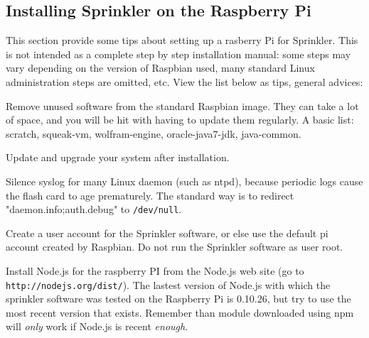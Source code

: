 \documentclass[11pt]{book}
\begin{document}
\subsection{Installing Sprinkler on the Raspberry Pi}
This section provide some tips about setting up a rasberry Pi for Sprinkler. This is not intended as a complete step by step installation manual: some steps may vary depending on the version of Raspbian used, many standard Linux administration steps are omitted, etc. View the list below as tips, general advices:
\begin{description}
\item Remove unused software from the standard Raspbian image. They can take a lot of space, and you will be hit with having to update them regularly. A basic list: scratch, squeak-vm, wolfram-engine, oracle-java7-jdk, java-common.
\item Update and upgrade your system after installation.
\item Silence syslog for many Linux daemon (such as ntpd), because periodic logs cause the flash card to age prematurely. The standard way is to redirect "daemon.info;auth.debug" to \texttt{/dev/null}.
\item Create a user account for the Sprinkler software, or else use the default pi account created by Raspbian. Do not run the Sprinkler software as user root.
\item Install Node.js for the raspberry PI from the Node.js web site (go to \texttt{http://nodejs.org/dist/}). The lastest version of Node.js with which the sprinkler software was tested on the Raspberry Pi is 0.10.26, but try to use the most recent version that exists. Remember than module downloaded using npm will \emph{only} work if Node.js is recent \emph{enough}.
\end{description}
\end{document}
